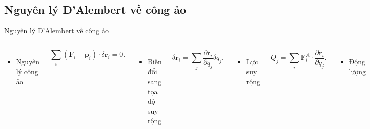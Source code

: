 \subsection{Nguyên lý D'Alembert về công ảo}

\begin{frame}{Nguyên lý D'Alembert về công ảo}
\vspace{-4mm}
\begin{columns}
    \begin{itemize}
        \item Nguyên lý công ảo
    \end{itemize}
    \begin{equation}
        \sum_{i} \left( \mathbf{F}_i - \dot{\mathbf{p}}_i \right) \cdot \delta \mathbf{r}_i = 0.
    \end{equation}
    \begin{itemize}
        \item Biến đổi sang tọa độ suy rộng
    \end{itemize}
    \begin{equation}
        \delta \mathbf{r}_i = \sum_{j} \frac{\partial \mathbf{r}_i}{\partial q_j} \delta q_j.
    \end{equation}


    \begin{itemize}
        \item Lực suy rộng
    \end{itemize}
    \begin{equation}
        Q_j = \sum_{i} \mathbf{F}^A_i \cdot \frac{\partial \mathbf{r}_i}{\partial q_j}.
    \end{equation}
    

    \begin{itemize}
        \item Động lượng
    \end{itemize}
    \begin{equation}
        \dot{\mathbf{p}}_i = \frac{\mathrm{d}}{\mathrm{d} t} \left( \frac{\partial T}{\partial \dot{\mathbf{r}}_i} \right) = \left[ \frac{\mathrm{d}}{\mathrm{d} t} \left( \frac{\partial T}{\partial \dot{q}_j} \right) - \frac{\partial T}{\partial q_j} \right] \frac{\partial \mathbf{r}_i}{\partial q_j}.
    \end{equation}

    \begin{itemize}
        \item Nguyên lý D'Alembert
    \end{itemize}
    \begin{equation}
        \sum_{j} \left[ Q_j - \frac{\mathrm{d}}{\mathrm{d} t} \left( \frac{\partial T}{\partial \dot{q}_j} \right) + \frac{\partial T}{\partial q_j} \right] \delta q_j = 0.
    \end{equation}
    Ta thu được phương trình Euler-Lagrange
    \begin{equation}
        Q_j = \frac{\mathrm{d}}{\mathrm{d} t} \left( \frac{\partial T}{\partial \dot{q}_j} \right) - \frac{\partial T}{\partial q_j}.
    \end{equation}
\end{columns}
\end{frame}

